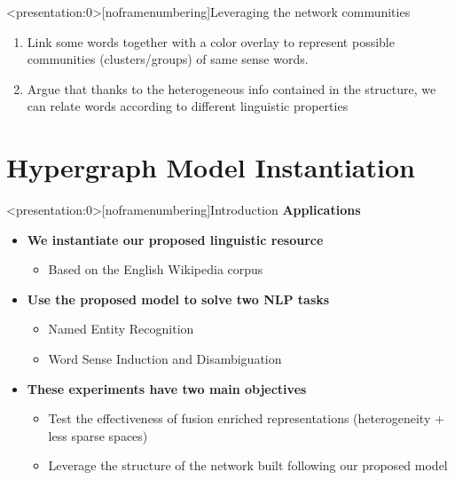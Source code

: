 \documentclass[10pt,xcolor=table]{beamer}
\begin{document}
\begin{frame}<presentation:0>[noframenumbering]{Leveraging the network communities} 
\begin{enumerate}
\item Link some words together with a color overlay to represent possible communities (clusters/groups) of same sense words. 
\item Argue that thanks to the heterogeneous info contained in the structure, we can relate words according to different linguistic properties 

\end{enumerate}
\end{frame}

\section[Applications to NLP]{Hypergraph Model Instantiation}



\begin{frame}<presentation:0>[noframenumbering]{Introduction}
\large \textbf{Applications}
\vspace{.5cm}
\begin{itemize}
\item \large \textbf{We instantiate our proposed linguistic resource}
\begin{itemize}
\item Based on the English Wikipedia corpus
\end{itemize}
\item \large \textbf{Use the proposed model  to solve two NLP tasks}
	\begin{itemize}
	\item Named Entity Recognition 
	\item Word Sense Induction and Disambiguation
	\end{itemize}
\vspace{.3cm}
\item \large \textbf{These experiments have two main objectives}
	\begin{itemize}
	\item Test the effectiveness of fusion enriched representations (heterogeneity + less sparse spaces)
	\item Leverage the structure of the network built following our proposed model
	\end{itemize}

\end{itemize}
\vspace{\textheight}
\end{frame}
\end{document}
